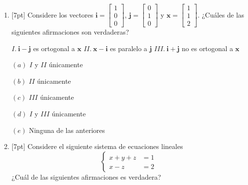 \documentclass[11pt]{article}
\begin{document}
\begin{enumerate}
\vspace{4pt}

\item{}[7pt] Considere los vectores $\mathbf{i} = \begin{bmatrix}1\\0\\0\end{bmatrix}$, $\mathbf{j} = \begin{bmatrix}0\\1\\0\end{bmatrix}$ y $\mathbf{x} = \begin{bmatrix}1\\1\\2\end{bmatrix}$. ¿Cuáles de las siguientes afirmaciones son verdaderas?

\vspace{4pt}
\noindent $I.\ \mathbf{i}-\mathbf{j}$ es ortogonal a $\mathbf{x}$ \hspace{1cm} $II.\ \mathbf{x}-\mathbf{i}$ es paralelo a $\mathbf{j}$ \hspace{1cm} $III.\ \mathbf{i}+\mathbf{j}$ no es ortogonal a $\mathbf{x}$

\vspace{6pt}
\noindent
\begin{minipage}[t]{0.33\linewidth}
$(a)$ $I$ y $II$ únicamente
\end{minipage}%
\begin{minipage}[t]{0.33\linewidth}
$(b)$ $II$ únicamente
\end{minipage}%
\begin{minipage}[t]{0.33\linewidth}
$(c)$ $III$ únicamente
\end{minipage}

\vspace{4pt}
\noindent
\begin{minipage}[t]{0.5\linewidth}
$(d)$ $I$ y $III$ únicamente
\end{minipage}%
\begin{minipage}[t]{0.5\linewidth}
$(e)$ Ninguna de las anteriores
\end{minipage}

\item{}[7pt] Considere el siguiente sistema de ecuaciones lineales
\[
\left\{
\begin{aligned}
x+y+z &=1\\
x-z &=2
\end{aligned}
\right.
\]
¿Cuál de las siguientes afirmaciones es verdadera?


\end{enumerate}
\end{document}
